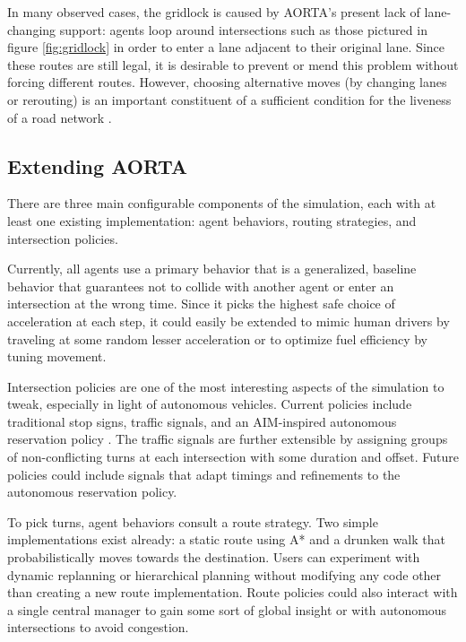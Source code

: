 \documentclass[letterpaper, 10 pt, conference]{ieeeconf}  %
\begin{document}
In many observed cases, the gridlock is caused by AORTA's present lack of
lane-changing support: agents loop around intersections such as those pictured
in figure \ref{fig:gridlock} in order to enter a lane adjacent to their original
lane.  Since these routes are still legal, it is desirable to prevent or mend
this problem without forcing different routes. However, choosing alternative
moves (by changing lanes or rerouting) is an important constituent of a
sufficient condition for the liveness of a road network \cite{AAAI11-au}.

\subsection{Extending AORTA}
\label{sec:config}

There are three main configurable components of the simulation, each with at
least one existing implementation: agent behaviors, routing strategies, and
intersection policies.

Currently, all agents use a primary behavior that is a generalized, baseline
behavior that guarantees not to collide with another agent or enter an
intersection at the wrong time. Since it picks the highest safe choice of
acceleration at each step, it could easily be extended to mimic human drivers by
traveling at some random lesser acceleration or to optimize fuel efficiency
by tuning movement.

Intersection policies are one of the most interesting aspects of the simulation
to tweak, especially in light of autonomous vehicles. Current policies include
traditional stop signs, traffic signals, and an AIM-inspired autonomous
reservation policy \cite{JAIR08-dresner}. The traffic signals are further
extensible by assigning groups of non-conflicting turns at each intersection
with some duration and offset. Future policies could include signals that adapt
timings and refinements to the autonomous reservation policy.

To pick turns, agent behaviors consult a route strategy. Two simple
implementations exist already: a static route using A* \cite{astar} and a
drunken walk that probabilistically moves towards the destination. Users can
experiment with dynamic replanning or hierarchical planning
\cite{Botea04nearoptimal} without modifying any code other than creating a new
route implementation. Route policies could also interact with a single central
manager to gain some sort of global insight or with autonomous intersections to
avoid congestion.
\end{document}
